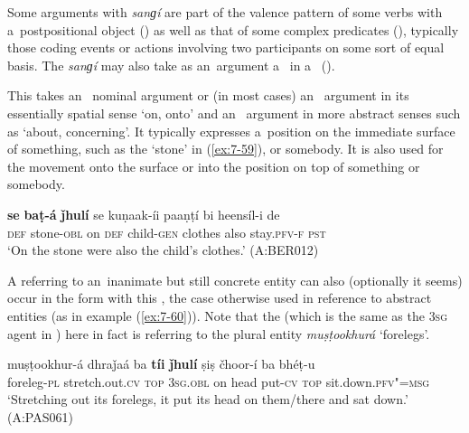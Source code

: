 Some arguments with \textit{sanɡí} are part of the valence pattern of some  verbs with a~postpositional object () as well as that of some complex predicates (), typically those coding events or actions involving two participants on some sort of equal basis. The  \textit{sanɡí} may also take as an~argument a~ in a~  ().


 This  takes an~ nominal argument or (in most cases) an~  argument in its essentially spatial sense `on, onto' and an~  argument in more abstract senses such as `about, concerning'. It typically expresses a~position on the immediate surface of something, such as the `stone' in (\ref{ex:7-59}), or somebody. It is also used for the movement onto the surface or into the position on top of something or somebody.

\begin{exe}
\ex
\label{ex:7-59}
\gll \textbf{se} \textbf{baṭ-á} \textbf{ǰhulí} se kuṇaak-íi paaṇṭí bi heensíl-i de \\
\textsc{def} stone-\textsc{obl} on \textsc{def}  child-\textsc{gen}  clothes also  stay.\textsc{pfv-f} \textsc{pst } \\
\glt `On the stone were also the child's clothes.' (A:BER012)
\end{exe}


A  referring to an~inanimate but still concrete entity can also (optionally it seems) occur in the  form with this , the case otherwise used in  reference to abstract entities (as in example (\ref{ex:7-60})). Note that the   (which is the same as the \textsc{3sg} agent in ) here in fact is referring to the plural entity \textit{muṣṭookhurá} `forelegs'.

\ea
\ex
\label{ex:7-60}
\gll muṣṭookhur-á dhraǰaá ba \textbf{tíi} \textbf{ǰhulí} ṣiṣ čhoor-í ba bhéṭ-u\\
foreleg-\textsc{pl} stretch.out.\textsc{cv} \textsc{top} \textsc{3sg.obl} on head put-\textsc{cv} \textsc{top} sit.down.\textsc{pfv"=msg}\\
\glt `Stretching out its forelegs, it put its head on them/there and sat down.' (A:PAS061)
\z

